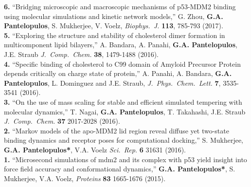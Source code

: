 \documentclass[a4paper]{article}
\def\jcc{\it J.~Comp.~Chem.}
\def\jpcl{\it J.~Phys.~Chem.~Lett.}
\def\prot{\it Proteins}
\def\bj{\it Biophys.~J.}
\def\jpcl{\it J.~Phys.~Chem.~Lett.}
\def\scirep{\it Sci.~Rep.}
\begin{document}
{\bf 6.} ``Bridging microscopic and macroscopic mechanisms of p53-MDM2 binding using molecular simulations and kinetic network models,'' G. Zhou, \textbf{G.A. Pantelopulos}, S. Mukherjee, V. Voelz, {\bj} {\bf 113},  785-793 (2017). \\
{\bf 5.} ``Exploring the structure and stability of cholesterol dimer formation in multicomponent lipid bilayers,'' A. Bandara, A. Panahi, \textbf{G.A. Pantelopulos}, J.E. Straub {\jcc} {\bf 38}, 1479-1488 (2016). \\
{\bf 4.}  ``Specific binding of cholesterol to C99 domain of Amyloid Precursor Protein depends critically on charge state of protein,'' A. Panahi, A. Bandara, \textbf{G.A. Pantelopulos}, L. Dominguez and J.E. Straub, {\jpcl} {\bf 7}, 3535-3541 (2016). \\
{\bf 3.} ``On the use of mass scaling for stable and efficient simulated tempering with molecular dynamics,'' T. Nagai, \textbf{G.A. Pantelopulos}, T. Takahashi, J.E. Straub {\jcc} {\bf 37} 2017-2028 (2016). \\
{\bf 2.} ``Markov models of the apo-MDM2 lid region reveal diffuse yet two-state binding dynamics and receptor poses for computational docking,'' S. Mukherjee, \textbf{G.A. Pantelopulos*}, V.A. Voelz {\scirep} {\bf 6} 31631 (2016). \\
{\bf 1.} ``Microsecond simulations of mdm2 and its complex with p53 yield insight into force field accuracy and conformational dynamics,'' \textbf{G.A. Pantelopulos*}, S. Mukherjee, V.A. Voelz, {\prot} {\bf 83} 1665-1676 (2015).
\end{document}
